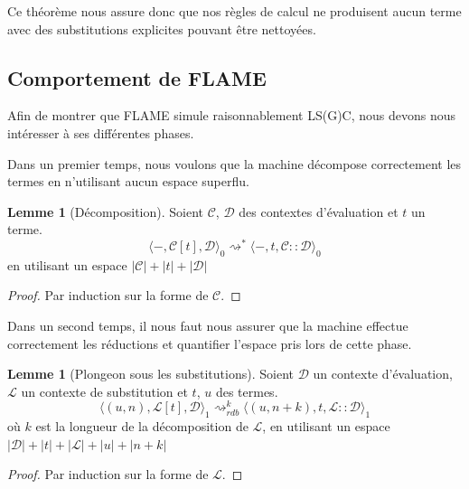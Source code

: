\documentclass[a4paper, 11pt]{article}
\theoremstyle{definition}
\newtheorem{lemma}[theorem]{Lemme}
\newcommand{\etatu}[1]{\langle #1 \rangle_1}
\newcommand{\mcc}{\mathcal{C}}
\newcommand{\mcd}{\mathcal{D}}
\newcommand{\mcl}{\mathcal{L}}
\begin{document}
Ce théorème nous assure donc que nos règles de calcul ne produisent aucun terme avec des substitutions explicites pouvant être nettoyées.

\subsection{Comportement de FLAME}
Afin de montrer que FLAME simule raisonnablement LS(G)C, nous devons nous intéresser à ses différentes phases.

Dans un premier temps, nous voulons que la machine décompose correctement les termes en n'utilisant aucun espace superflu.
\begin{lemma}[Décomposition]
  \label{lemmaplouf}
  Soient $\mathcal{C}$, $\mathcal{D}$ des contextes d'évaluation et $t$ un terme.
\[\langle -,\mathcal{C}[t], \mathcal{D}\rangle_0 \rightsquigarrow^* \langle -,t,\mathcal{C} :: \mathcal{D}\rangle_0\]
en utilisant un espace $|\mcc|+|t|+|\mcd|$
\end{lemma}
\begin{proof}
  Par induction sur la forme de $\mathcal{C}$.
\end{proof}

Dans un second temps, il nous faut nous assurer que la machine effectue correctement les réductions et quantifier l'espace pris lors de cette phase.
\begin{lemma}[Plongeon sous les substitutions]
  \label{lemmaplouf2}
  Soient $\mathcal{D}$ un contexte d'évaluation, $\mcl$ un contexte de substitution et $t$, $u$ des termes.
  \[ \etatu{(u,n), \mcl[t], \mcd} \rightsquigarrow_{rdb}^k \etatu{(u,n+k), t, \mcl::\mcd} \]
  où $k$ est la longueur de la décomposition de $\mcl$,
en utilisant un espace $|\mcd|+|t|+|\mcl|+|u| + |n+k|$
\end{lemma}
\begin{proof}
  Par induction sur la forme de $\mathcal{L}$.
\end{proof}
\end{document}
